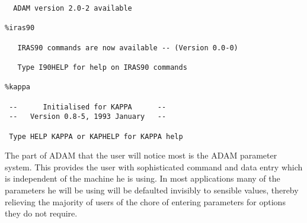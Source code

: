 \documentclass[twoside,11pt]{article}
\begin{document}
\begin{itemize}
\begin{small}
\begin{verbatim}
  ADAM version 2.0-2 available

%iras90
 
   IRAS90 commands are now available -- (Version 0.0-0)
 
   Type I90HELP for help on IRAS90 commands

%kappa
 
 --      Initialised for KAPPA      -- 
 --   Version 0.8-5, 1993 January   -- 
 
 Type HELP KAPPA or KAPHELP for KAPPA help   
\end{verbatim}
\end{small}
\end{itemize}

The part of ADAM that the user will notice most is the ADAM parameter system.
This provides the user with sophisticated command and data entry which is 
independent of the machine he is using. In most applications many of the
parameters he will be using will be defaulted invisibly to sensible values,
thereby relieving the majority of users of the chore of entering parameters for
options they do not require.
\end{document}
